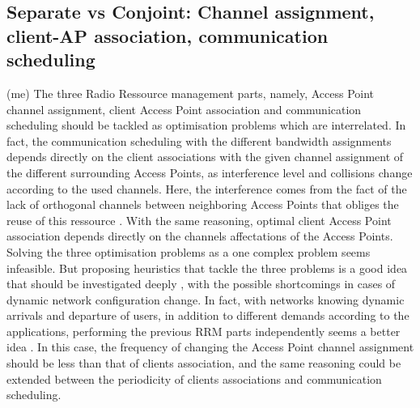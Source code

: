 \documentclass[journal,transmag]{IEEEtran}
\begin{document}
\subsection{Separate vs Conjoint: Channel assignment, client-AP association, communication scheduling} (me)
The three Radio Ressource management parts, namely, Access Point channel assignment, client Access Point association and communication scheduling should be tackled as optimisation problems which are interrelated. In fact, the communication scheduling with the different bandwidth assignments depends directly on the client associations with the given channel assignment of the different surrounding Access Points, as interference level and collisions change according to the used channels. Here, the interference comes from the fact of the lack of orthogonal channels between neighboring Access Points that obliges the reuse of this ressource \cite{07measurment_self_WIFI,16AP_association_optimisation_fairness}. With the same reasoning, optimal client Access Point association depends directly on the channels affectations of the Access Points. Solving the three optimisation problems as a one complex problem seems infeasible. But proposing heuristics that tackle the three problems is a good idea that should be investigated deeply \cite{14throughput_optimisation_AP_association_interefrence}, with the possible shortcomings in cases of dynamic network configuration change. In fact, with networks knowing dynamic arrivals and departure of users, in addition to different demands according to the applications, performing the previous RRM parts independently seems a better idea \cite{07measurment_self_WIFI}. In this case, the frequency of changing the Access Point channel assignment should be less than that of clients association, and the same reasoning could be extended between the periodicity of clients associations and communication scheduling.  
\end{document}
